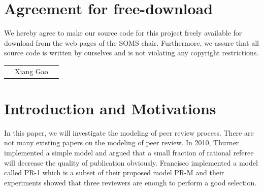 \documentclass[11pt]{article}
\begin{document}

\newpage


\newpage
\section*{Agreement for free-download}
\bigskip


\bigskip


\large We hereby agree to make our source code for this project freely available for download from the web pages of the SOMS chair. Furthermore, we assure that all source code is written by ourselves and is not violating any copyright restrictions.

\begin{center}

\bigskip


\bigskip


\begin{tabular}{@{}p{3.3cm}@{}p{6cm}@{}@{}p{6cm}@{}}
\begin{minipage}{3cm}

\end{minipage}
&
\begin{minipage}{6cm}
\vspace{2mm} \large Xiang Gao

\vspace{\baselineskip}

\end{minipage}
&
\begin{minipage}{6cm}

\end{minipage}
\end{tabular}


\end{center}
\newpage


% 


\tableofcontents

\newpage


\section{Introduction and Motivations}
In this paper, we will investigate the modeling of peer review process. There are not many existing papers on the modeling of peer review. In 2010, Thurner \cite{thurner2010peer} implemented a simple model and argued that a small fraction of rational referee will decrease the quality of publication obviously. Francisco \cite{grimaldoproposal} implemented a model called PR-1 which is a subset of their proposed model PR-M and their experiments showed that three reviewers are enough to perform a good selection.
\end{document}
